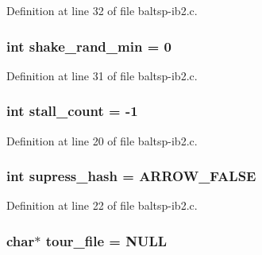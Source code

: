 Definition at line 32 of file baltsp-ib2.c.\hypertarget{bin_2baltsp-ib2_8c_b7fc57ece1162e77f74b4803961b72cb}{
\subsubsection[{shake\_\-rand\_\-min}]{\setlength{\rightskip}{0pt plus 5cm}int {\bf shake\_\-rand\_\-min} = 0}}
\label{bin_2baltsp-ib2_8c_b7fc57ece1162e77f74b4803961b72cb}




Definition at line 31 of file baltsp-ib2.c.\hypertarget{bin_2baltsp-ib2_8c_a1641a28cf3ea572a56763e84518c17b}{
\subsubsection[{stall\_\-count}]{\setlength{\rightskip}{0pt plus 5cm}int {\bf stall\_\-count} = -1}}
\label{bin_2baltsp-ib2_8c_a1641a28cf3ea572a56763e84518c17b}




Definition at line 20 of file baltsp-ib2.c.\hypertarget{bin_2baltsp-ib2_8c_c022145e682345ed4064bad274e5a4f1}{
\subsubsection[{supress\_\-hash}]{\setlength{\rightskip}{0pt plus 5cm}int {\bf supress\_\-hash} = ARROW\_\-FALSE}}
\label{bin_2baltsp-ib2_8c_c022145e682345ed4064bad274e5a4f1}




Definition at line 22 of file baltsp-ib2.c.\hypertarget{bin_2baltsp-ib2_8c_b818a82f867be75d7c4d92d792b0943e}{
\subsubsection[{tour\_\-file}]{\setlength{\rightskip}{0pt plus 5cm}char$\ast$ {\bf tour\_\-file} = NULL}}
\label{bin_2baltsp-ib2_8c_b818a82f867be75d7c4d92d792b0943e}




